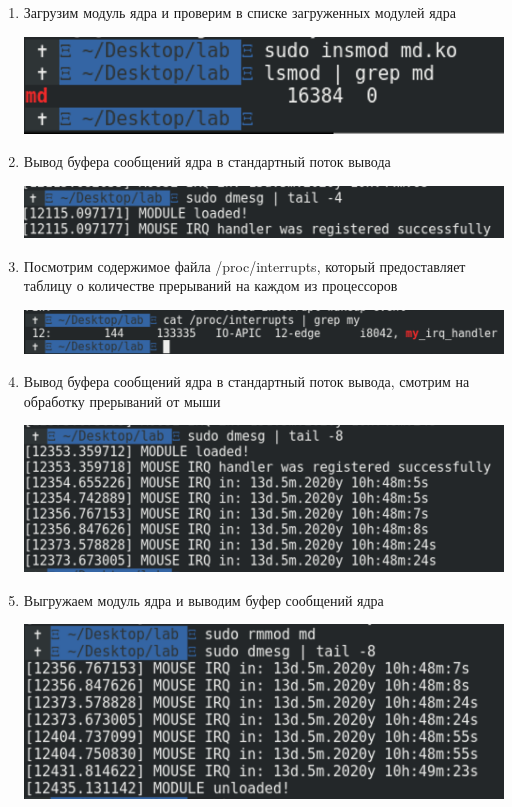 \documentclass[a4paper,14pt]{extreport} %
\begin{document}
\begin{enumerate}
\item Загрузим модуль ядра и проверим в списке загруженных модулей ядра

\includegraphics[scale=0.8]{1}

\item Вывод буфера сообщений ядра в стандартный поток вывода

\includegraphics[scale=0.8]{2}

\item Посмотрим содержимое файла /proc/interrupts, который предоставляет таблицу о количестве прерываний на каждом из процессоров

\includegraphics[scale=0.5]{3}

\item Вывод буфера сообщений ядра в стандартный поток вывода, смотрим на обработку прерываний от мыши

\includegraphics[scale=0.8]{4}

\item Выгружаем модуль ядра и выводим буфер сообщений ядра

\includegraphics[scale=0.8]{5}

\end{enumerate}
\end{document}
